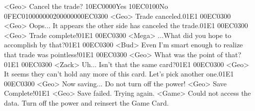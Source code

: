 <Geo> Cancel the trade? {10}{EC}{00}{00}Yes {10}{EC}{01}{00}No {0F}{EC}{01}{00}{00}{00}{02}{00}{00}{00}{00}{EC}{03}{00}
<Geo> Trade canceled.{01}{E1} {00}{EC}{03}{00}
<Geo> Oops... It appears the other side has canceled the trade.{01}{E1} {00}{EC}{03}{00}
<Geo> Trade complete!{01}{E1} {00}{EC}{03}{00}
<Mega> ...What did you hope to accomplish by that?{01}{E1} {00}{EC}{03}{00}
<Bud> Even I'm smart enough to realize that trade was pointless!{01}{E1} {00}{EC}{03}{00}
<Geo> What was the point of that?{01}{E1} {00}{EC}{03}{00}
<Zack> Uh... Isn't that the same card?{01}{E1} {00}{EC}{03}{00}
<Geo> It seems they can't hold any more of this card. Let's pick another one.{01}{E1} {00}{EC}{03}{00}
<Geo> Now saving... Do not turn off the power!
<Geo> Save Complete!{01}{E1}
<Geo> Save failed. Trying again. 
<Game> Could not access the data. Turn off the power and reinsert the Game Card.
